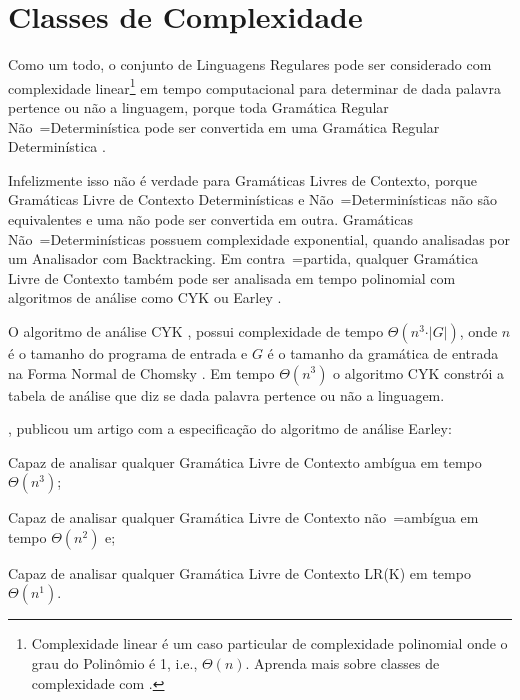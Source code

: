 \section{Classes de Complexidade}
\label{classesDeComplexidade}

Como um todo,
o conjunto de Linguagens Regulares pode ser considerado com complexidade linear\footnote{
Complexidade linear é um caso particular de complexidade polinomial onde o grau do Polinômio é 1,
i.e.,
$\Theta(n)$.
Aprenda mais sobre classes de complexidade com .
}
em tempo computacional para determinar de dada palavra pertence ou
não a linguagem,
porque toda Gramática Regular Não~=Determinística pode ser convertida em uma Gramática Regular Determinística \cite{sipserBook}.

Infelizmente isso não é verdade para Gramáticas Livres de Contexto,
porque Gramáticas Livre de Contexto Determinísticas e
Não~=Determinísticas não são equivalentes e
uma não pode ser convertida em outra.
Gramáticas Não~=Determinísticas possuem complexidade exponential,
quando analisadas por um Analisador com Backtracking.
Em contra~=partida,
qualquer Gramática Livre de Contexto também pode ser analisada em tempo polinomial com algoritmos de análise como CYK ou
Earley \cite{larkContextualLexer}.

O algoritmo de análise CYK \cite{hopcroftBook,larkContextualLexer},
possui complexidade de tempo $\Theta(n^3 \cdot \vert{G}\vert)$,
onde $n$ é o tamanho do programa de entrada e
$G$ é o tamanho da gramática de entrada na Forma Normal de Chomsky \cite{hopcroftBook}.
Em tempo $\Theta(n^3)$ o algoritmo CYK constrói a tabela de análise que diz se dada palavra pertence ou
não a linguagem.

,
publicou um artigo com a especificação do algoritmo de análise Earley:
\begin{inparaenum}[1)]
\item Capaz de analisar qualquer Gramática Livre de Contexto ambígua em tempo $\Theta(n^3)$;
\item Capaz de analisar qualquer Gramática Livre de Contexto não~=ambígua em tempo $\Theta(n^2)$ e;
\item Capaz de analisar qualquer Gramática Livre de Contexto LR(K) em tempo $\Theta(n^1)$.
\end{inparaenum}



